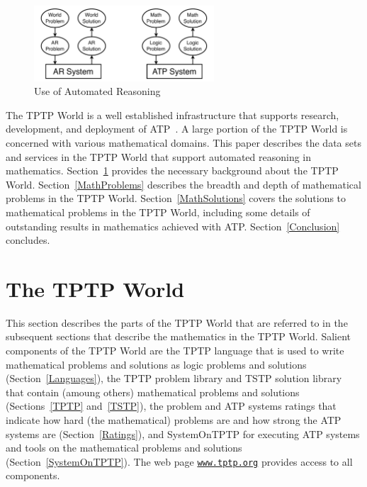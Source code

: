 \documentclass[runningheads]{llncs}
\begin{document}
\begin{figure}[htb]
\centering
\includegraphics[width=0.6\textwidth]{UseOfAR.pdf}
\vspace*{-1em}
\caption{Use of Automated Reasoning}
\label{UseOfAR}
\end{figure}

The TPTP World is a well established infrastructure that supports research, development, and 
deployment of ATP~\cite{Sut10,Sut17}.
A large portion of the TPTP World is concerned with various mathematical domains.
This paper describes the data sets and services in the TPTP World that support automated reasoning
in mathematics.
Section~\ref{TPTPWorld} provides the necessary background about the TPTP World.
Section~\ref{MathProblems} describes the breadth and depth of mathematical problems in the TPTP
World.
Section~\ref{MathSolutions} covers the solutions to mathematical problems in the TPTP World,
including some details of outstanding results in mathematics achieved with ATP.
Section~\ref{Conclusion} concludes.

\section{The TPTP World}
\label{TPTPWorld}

This section describes the parts of the TPTP World that are referred to in the subsequent sections 
that describe the mathematics in the TPTP World.
Salient components of the TPTP World are
the TPTP language that is used to write mathematical problems and solutions as logic problems and 
solutions (Section~\ref{Languages}),
the TPTP problem library and TSTP solution library that contain (amoung others) mathematical
problems and solutions (Sections~\ref{TPTP} and~\ref{TSTP}),
the problem and ATP systems ratings that indicate how hard (the mathematical) problems are and 
how strong the ATP systems are (Section~\ref{Ratings}),
and SystemOnTPTP for executing ATP systems and tools on the mathematical problems and solutions
(Section~\ref{SystemOnTPTP}).
The web page \href{http://www.tptp.org}{{\tt www.tptp.org}} provides access to all components.
\end{document}

